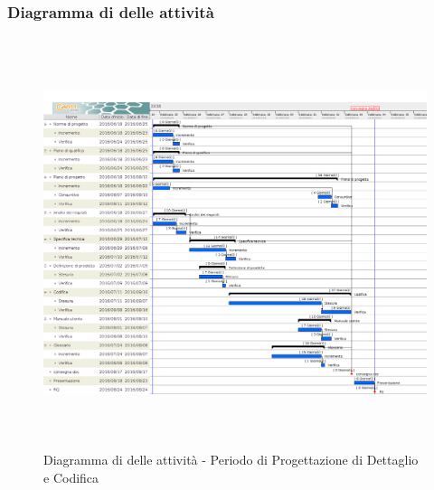 		\subsubsection{Diagramma di  delle attività}
		
		\begin{figure}[!h]
			\centering
			\includegraphics[height=12cm, width=15cm]{img/gantt/PDC} 
			\caption{Diagramma di  delle attività - Periodo di Progettazione di Dettaglio e Codifica}
		\end{figure}
		
